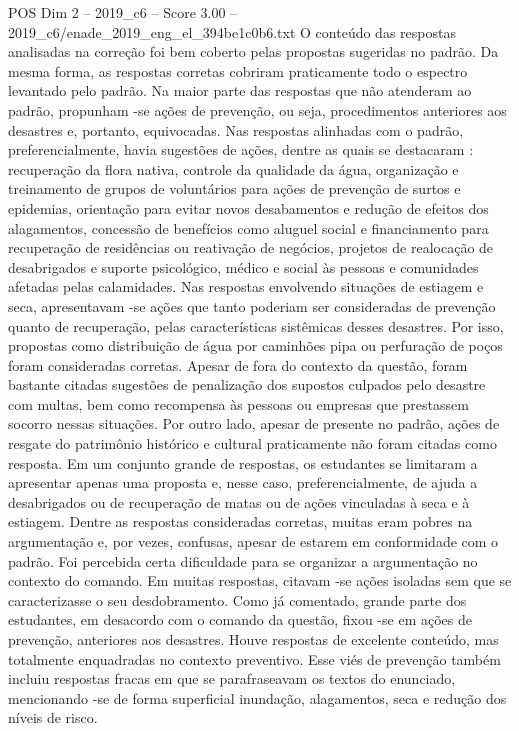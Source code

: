 \begin{textsample}{POS Dim 2 – 2019\_c6 – Score 3.00 – 2019\_c6/enade\_2019\_eng\_el\_394be1c0b6.txt}
O conteúdo das respostas analisadas na correção foi bem coberto pelas propostas sugeridas no padrão.
Da mesma forma, as respostas corretas cobriram praticamente todo o espectro levantado pelo padrão.
Na maior parte das respostas que não atenderam ao padrão, propunham -se ações de prevenção, ou seja, procedimentos anteriores aos desastres e, portanto, equivocadas.
Nas respostas alinhadas com o padrão, preferencialmente, havia sugestões de ações, dentre as quais se destacaram : recuperação da flora nativa, controle da qualidade da água, organização e treinamento de grupos de voluntários para ações de prevenção de surtos e epidemias, orientação para evitar novos desabamentos e redução de efeitos dos alagamentos, concessão de benefícios como aluguel social e financiamento para recuperação de residências ou reativação de negócios, projetos de realocação de desabrigados e suporte psicológico, médico e social às pessoas e comunidades afetadas pelas calamidades.
Nas respostas envolvendo situações de estiagem e seca, apresentavam -se ações que tanto poderiam ser consideradas de prevenção quanto de recuperação, pelas características sistêmicas desses desastres.
Por isso, propostas como distribuição de água por caminhões pipa ou perfuração de poços foram consideradas corretas.
Apesar de fora do contexto da questão, foram bastante citadas sugestões de penalização dos supostos culpados pelo desastre com multas, bem como recompensa às pessoas ou empresas que prestassem socorro nessas situações.
Por outro lado, apesar de presente no padrão, ações de resgate do patrimônio histórico e cultural praticamente não foram citadas como resposta.
Em um conjunto grande de respostas, os estudantes se limitaram a apresentar apenas uma proposta e, nesse caso, preferencialmente, de ajuda a desabrigados ou de recuperação de matas ou de ações vinculadas à seca e à estiagem.
Dentre as respostas consideradas corretas, muitas eram pobres na argumentação e, por vezes, confusas, apesar de estarem em conformidade com o padrão.
Foi percebida certa dificuldade para se organizar a argumentação no contexto do comando.
Em muitas respostas, citavam -se ações isoladas sem que se caracterizasse o seu desdobramento.
Como já comentado, grande parte dos estudantes, em desacordo com o comando da questão, fixou -se em ações de prevenção, anteriores aos desastres.
Houve respostas de excelente conteúdo, mas totalmente enquadradas no contexto preventivo.
Esse viés de prevenção também incluiu respostas fracas em que se parafraseavam os textos do enunciado, mencionando -se de forma superficial inundação, alagamentos, seca e redução dos níveis de risco.

\end{textsample}

